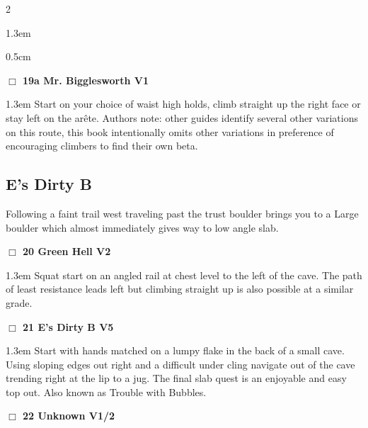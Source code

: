 \begin{multicols}{2}
\begin{adjustwidth}{1.3em}{}
\end{adjustwidth}
\begin{adjustwidth}{0.5cm}{}				
\needspace{4em}
\needspace{2em}
\label{vr:Mr. Bigglesworth}
\colorbox{green!20}{
\parbox{0.95\linewidth}{
\hspace{-1ex}\textbf{$\Box$
19a Mr. Bigglesworth V1  
}}}
\begin{adjustwidth}{1.3em}{}			
Start on your choice of waist high holds, climb straight up the right face or stay left on the arête. Authors note: other guides identify several other variations on this route, this book intentionally omits other variations in preference of encouraging climbers to find their own beta.
\end{adjustwidth}
\end{adjustwidth}
\needspace{10em}
\subsection*{E's Dirty B}\label{bf:E's Dirty B}
Following a faint trail west traveling past the trust boulder brings you to a Large boulder which almost immediately gives way to low angle slab.\\
\needspace{2em}
\label{rt:Green Hell}
\colorbox{green!20}{
\parbox{0.95\linewidth}{
\hspace{-1ex}\textbf{$\Box$
20 Green Hell V2  
}}}
\begin{adjustwidth}{1.3em}{}			
Squat start on an angled rail at chest level to the left of the cave. The path of least resistance leads left but climbing straight up is also possible at a similar grade.
\end{adjustwidth}
\needspace{2em}
\label{rt:E's Dirty B}
\colorbox{RoyalBlue!20}{
\parbox{0.95\linewidth}{
\hspace{-1ex}\textbf{$\Box$
21 E's Dirty B V5  
}}}
\begin{adjustwidth}{1.3em}{}			
Start with hands matched on a lumpy flake in the back of a small cave. Using sloping edges out right and a difficult under cling navigate out of the cave trending right at the lip to a jug. The final slab quest is an enjoyable and easy top out. Also known as Trouble with Bubbles.
\end{adjustwidth}
\needspace{2em}
\label{rt:Unknown on E's Dirty B}
\colorbox{green!20}{
\parbox{0.95\linewidth}{
\hspace{-1ex}\textbf{$\Box$
22 Unknown V1/2  
}}}
\end{multicols}
